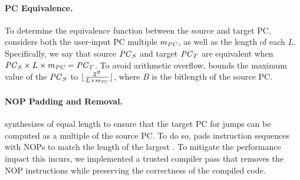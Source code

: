 \paragraph{PC Equivalence.}
To determine the equivalence function between the source and target PC,
\jitsynth considers both the user-input PC multiple $m_{\mathit{PC}}$,
as well as the length of each \minicompiler $L$.
Specifically, we say that source $\mathit{PC}_S$ and target $\mathit{PC}_T$
are equivalent when $\mathit{PC}_S \times L \times m_{\mathit{PC}} = \mathit{PC}_T$.
To avoid arithmetic overflow,
\jitsynth bounds the maximum value of the $\mathit{PC}_S$ to
$\lfloor\frac{2^B}{L \times m_{\mathit{PC}}}\rfloor$,
where $B$ is the bitlength of the source PC.

\paragraph{NOP Padding and Removal.}
\jitsynth synthesizes \minicompilers of equal length to ensure that
the target PC for jumps can be computed as a multiple of the source PC.
%
To do so, \jitsynth pads instruction sequences with NOPs to match the length
of the largest \minicompiler.
%
To mitigate the performance impact this incurs, we implemented a trusted compiler
pass that removes the NOP instructions while preserving the correctness of
the compiled code.
\tighten
